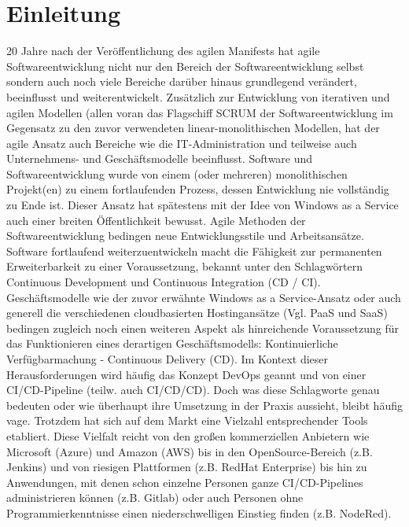 \section{Einleitung}
\label{Einleitung}
20 Jahre nach der Veröffentlichung des agilen Manifests \cite{eckstein_20_2021} hat agile Softwareentwicklung nicht nur den Bereich der Softwareentwicklung selbst sondern auch noch viele Bereiche darüber hinaus grundlegend verändert, beeinflusst und weiterentwickelt. Zusätzlich zur Entwicklung von iterativen und agilen Modellen (allen voran das Flagschiff \gls{SCRUM} der Softwareentwicklung im Gegensatz zu den zuvor verwendeten linear-monolithischen Modellen, hat der agile Ansatz auch Bereiche wie die IT-Administration und teilweise auch Unternehmens- und Geschäftsmodelle beeinflusst.
Software und Softwareentwicklung wurde von einem (oder mehreren) monolithischen Projekt(en) zu einem fortlaufenden Prozess, dessen Entwicklung nie vollständig zu Ende ist. Dieser Ansatz hat spätestens mit der Idee von \grqq{}Windows as a Service\glqq{} \cite{jaimeo_kurzanleitung_2021} auch einer breiten Öffentlichkeit bewusst.\newline
Agile Methoden der Softwareentwicklung bedingen neue Entwicklungsstile und Arbeitsansätze. Software fortlaufend weiterzuentwickeln  macht die Fähigkeit zur permanenten Erweiterbarkeit zu einer Voraussetzung, bekannt unter den Schlagwörtern \glqq{} Continuous Development\grqq{} und \glqq{} Continuous Integration\grqq{}  (\acrshort{CD} / \acrshort{CI}). Geschäftsmodelle wie der zuvor erwähnte \glqq{}Windows as a Service\grqq{}-Ansatz oder auch generell die verschiedenen cloudbasierten Hostingansätze (Vgl. \acrshort{PaaS} und \acrshort{SaaS}) bedingen zugleich noch einen weiteren Aspekt als hinreichende Voraussetzung für das Funktionieren eines derartigen Geschäftsmodells: Kontinuierliche Verfügbarmachung - \glqq{}Continuous Delivery\grqq{} (\acrshort{CD}).\newline
Im Kontext dieser Herausforderungen wird häufig das Konzept \glqq{}\acrshort{DevOps}\grqq{} geannt und von einer \acrshort{CI}/\acrshort{CD}-Pipeline (teilw. auch \acrshort{CI}/\acrshort{CD}/\acrshort{CD}).
Doch was diese Schlagworte genau bedeuten oder wie überhaupt ihre Umsetzung in der Praxis aussieht, bleibt
häufig vage. Trotzdem hat sich auf dem Markt eine Vielzahl entsprechender Tools etabliert.
Diese Vielfalt reicht von den großen kommerziellen Anbietern wie Microsoft (Azure) und Amazon
(AWS) bis in den OpenSource-Bereich (z.B. Jenkins) und von riesigen Plattformen (z.B. RedHat Enterprise) bis hin zu Anwendungen, mit denen schon einzelne Personen ganze \acrshort{CI}/\acrshort{CD}-Pipelines administrieren können (z.B. Gitlab) oder auch Personen ohne Programmierkenntnisse einen niederschwelligen Einstieg finden (z.B. NodeRed).